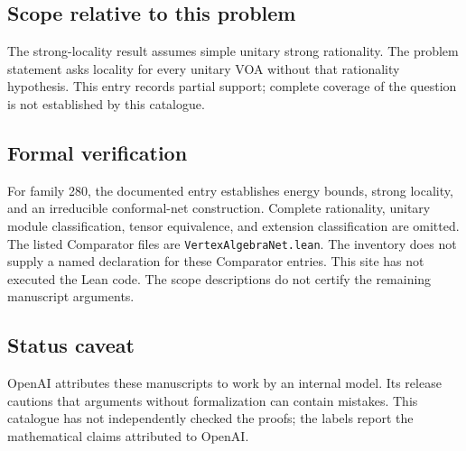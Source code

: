 \documentclass[11pt]{article}
\begin{document}
\subsection{Scope relative to this problem}
The strong-locality result assumes simple unitary strong rationality. The problem statement asks locality for every unitary VOA without that rationality hypothesis. This entry records partial support; complete coverage of the question is not established by this catalogue.

\subsection{Formal verification}
For family 280, the documented entry establishes energy bounds, strong locality, and an irreducible conformal-net construction. Complete rationality, unitary module classification, tensor equivalence, and extension classification are omitted. The listed Comparator files are \texttt{VertexAlgebraNet.lean}. The inventory does not supply a named declaration for these Comparator entries. This site has not executed the Lean code. The scope descriptions do not certify the remaining manuscript arguments.

\subsection{Status caveat}
OpenAI attributes these manuscripts to work by an internal model. Its release cautions that arguments without formalization can contain mistakes. This catalogue has not independently checked the proofs; the labels report the mathematical claims attributed to OpenAI.
\end{document}
